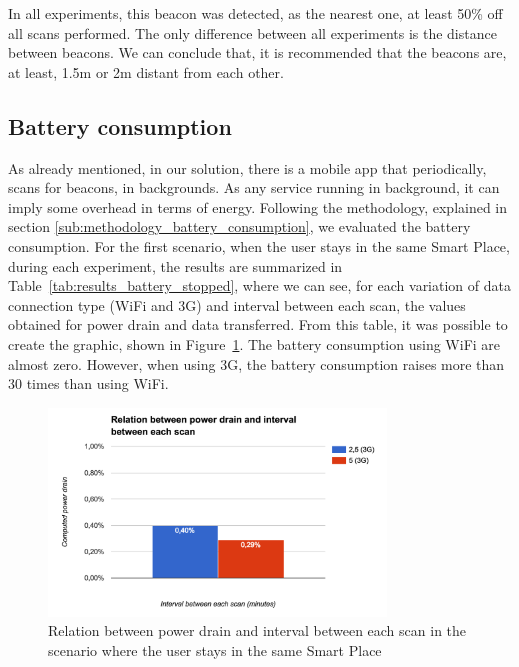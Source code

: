 In all experiments, this beacon was detected, as the nearest one, at least 50\% off all scans performed.
The only difference between all experiments is the distance between beacons.
We can conclude that, it is recommended that the beacons are, at least, 1.5m or 2m distant from each other.


\subsection{Battery consumption}
\label{sub:results_battery_consumption}
As already mentioned, in our solution, there is a mobile app that periodically, scans for beacons, in backgrounds.
As any service running in background, it can imply some overhead in terms of energy.
Following the methodology, explained in section \ref{sub:methodology_battery_consumption}, we evaluated the battery consumption.
For the first scenario, when the user stays in the same Smart Place, during each experiment, the results are summarized in Table~\ref{tab:results_battery_stopped}, where we can see, for each variation of data connection type (\gls{WiFi} and \gls{3G}) and interval between each scan, the values obtained for power drain and data transferred.
From this table, it was possible to create the graphic, shown in Figure~\ref{fig:results_battery_stopped}.
The battery consumption using \gls{WiFi} are almost zero.
However, when using \gls{3G}, the battery consumption raises more than 30 times than using \gls{WiFi}.



\begin{figure}[!ht]
  \centering
    \includegraphics[width=0.8\textwidth, keepaspectratio]{images/results_battery_stopped}
    \caption[Power drain when the user does not move]{Relation between power drain and interval between each scan in the scenario where the user stays in the same Smart Place}
    \label{fig:results_battery_stopped}
\end{figure}

